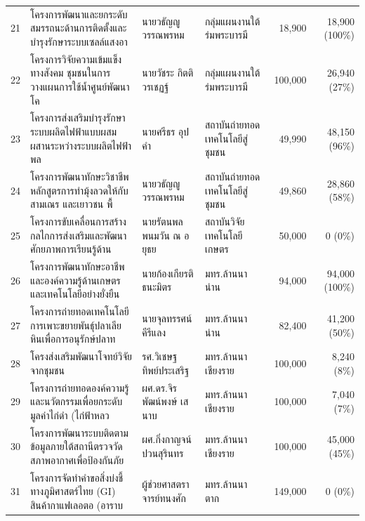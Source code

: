 {\begin{longtable}{@{}p{0.5cm}p{6.1cm}p{2.9cm}p{2.7cm}rr@{}}
21 & โครงการพัฒนาและยกระดับสมรรถนะด้านการติดตั้งและบำรุงรักษาระบบเซลล์แสงอา & นายวธัญญู วรรณพรหม & กลุ่มแผนงานใต้ร่มพระบารมี & 18,900 & 18,900 (100\%)\\
22 & โครงการวิจัยความเข้มแข็งทางสังคม ชุมชนในการวางแผนการใช้น้ำศูนย์พัฒนาโค & นายวัชระ กิตติวรเชฏฐ์ & กลุ่มแผนงานใต้ร่มพระบารมี & 100,000 & 26,940 (27\%)\\
23 & โครงการส่งเสริมบำรุงรักษาระบบผลิตไฟฟ้าแบบผสมผสานระหว่างระบบผลิตไฟฟ้าพล & นายศรีธร อุปคำ & สถาบันถ่ายทอดเทคโนโลยีสู่ชุมชน & 49,990 & 48,150 (96\%)\\
24 & โครงการพัฒนาทักษะวิชาชีพหลักสูตรการทำมุ้งลวดให้กับสามเณร และเยาวชน พื้ & นายวธัญญู วรรณพรหม & สถาบันถ่ายทอดเทคโนโลยีสู่ชุมชน & 49,860 & 28,860 (58\%)\\
25 & โครงการขับเคลื่อนการสร้างกลไกการส่งเสริมและพัฒนาศักยภาพการเรียนรู้ด้าน & นายรัตนพล พนมวัน ณ อยุธย & สถาบันวิจัยเทคโนโลยีเกษตร & 50,000 & 0 (0\%)\\
26 & โครงการพัฒนาทักษะอาชีพและองค์ความรู้ด้านเกษตรและเทคโนโลยีอย่างยั่งยืน & นายก้องเกียรติ ธนะมิตร & มทร.ล้านนา น่าน & 94,000 & 94,000 (100\%)\\
27 & โครงการถ่ายทอดเทคโนโลยีการเพาะขยายพันธุ์ปลาเลียหินเพื่อการอนุรักษ์ปลาท & นายจุลทรรศน์ คีรีแลง & มทร.ล้านนา น่าน & 82,400 & 41,200 (50\%)\\
28 & โครงส่งเสริมพัฒนาโจทย์วิจัยจากชุมชน & รศ.วิเชษฐ ทิพย์ประเสริฐ & มทร.ล้านนา เชียงราย & 100,000 & 8,240 (8\%)\\
29 & โครงการถ่ายทอดองค์ความรู้และนวัตกรรมเพื่อยกระดับมูลค่าไก่ดำ (ไก่ฟ้าหลว & ผศ.ดร.จิรพัฒน์พงษ์ เสนาบ & มทร.ล้านนา เชียงราย & 100,000 & 7,040 (7\%)\\
30 & โครงการพัฒนาระบบติดตามข้อมูลภายใต้สถานีตรวจวัดสภาพอากาศเพื่อป้องกันภัย & ผศ.กิ่งกาญจน์ ปวนสุรินทร & มทร.ล้านนา เชียงราย & 100,000 & 45,000 (45\%)\\
31 & โครงการจัดทำคำขอสิ่งบ่งชี้ทางภูมิศาสตร์ไทย (GI) สินค้ากาแฟเลอตอ (อาราบ & ผู้ช่วยศาสตราจารย์ทนงศัก & มทร.ล้านนา ตาก & 149,000 & 0 (0\%)\\
\midrule
\bottomrule
\end{longtable}
}
